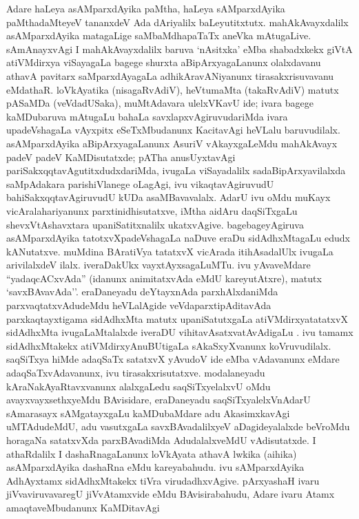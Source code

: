Adare haLeya asAMparxdAyika paMtha, haLeya sAMparxdAyika paMtha\-daMteyeV tananxdeV Ada dAriyalilx baLeyutitxtutx. mahAkAvayxdalilx asAMparxdAyika matagaLige saMbaMdhapaTaTx aneVka mAtugaLive. sAmAnayxvAgi I mahAkAvayxdalilx baruva `nAsitxka' eMba shabadxkekx  giVtA  atiVMdirxya viSayagaLa bagege shurxta aBipArxya\-gaLanunx olalx\-davanu athavA pavitarx saMparxdAyagaLa adhikAravANiyanunx tirasakxrisuvavanu eMdathaR. loVkAyatika (nisagaRvAdiV), heVtumaMta (takaRvAdiV) matutx pASaMDa (veVdadUSaka), muMtAdavara ulelxVKavU ide; ivara bagege kaMDu\-baruva mAtugaLu bahaLa savxlapxvAgiruvudariMda ivara upadeVshagaLa vAyxpitx eSeTxMbu\-danunx KacitavAgi heVLalu baruvudilalx. asAMparxdAyika aBipArxyagaLanunx AsuriV vAkayxgaLeMdu mahAkAvayx padeV padeV KaMDisutatxde; pATha anusUyxtavAgi pariSakxqqta\-vAgutitxdudxdariMda, ivugaLa viSayadalilx sadaBipArxyavilalxda saMpAdakara parishiVlanege oLagAgi, ivu vikaqtavAgiruvudU bahiSakxqqtavAgiruvudU kUDa asaMBavavalalx. AdarU ivu oMdu muKayx vicAralahariyanunx parxtinidhisutatxve, iMtha aidAru daqSiTxgaLu shevxVtAshavxtara upaniSatitxnalilx ukatxvAgive. bagebageyAgiruva asAMparxdAyika tatotxvXpadeVshagaLa naDuve eraDu sidAdhxMtagaLu edudx kANutatxve. muMdina BAratiVya tatatxvX vicArada itihAsadalUlx ivugaLa arivilalxdeV ilalx. iveraDakUkx vayxtAyxsagaLuMTu. ivu yAvaveMdare ``yadaqcACxvAda'' (idanunx animitatxvAda eMdU kareyutAtxre), matutx `savxBAvavAda''. eraDaneyadu deYtayxnAda parxhAlxdaniMda parxvaqtatxvAdudeMdu heVLalAgide  veVdaparxtipAditavAda parxkaqtayxtigama sidAdhxMta  matutx upaniSatutxgaLa atiVMdirxyatatatxvX sidAdhxMta  ivugaLaMtalalxde iveraDU vihitavAsatxvatAvAdigaLu . ivu tamamx sidAdhxMtakekx atiVMdirxyAnuBUtigaLa sAkaSxyXvanunx koVruvudilalx. saqSiTxya hiMde adaqSaTx satatxvX yAvudoV ide eMba vAdavanunx eMdare adaqSaTxvAdavanunx, ivu tirasakxrisutatxve. modalaneyadu kAraNakAyaRtavxvanunx alalxgaLedu saqSiTxyelalxvU oMdu avayxvayxsethxyeMdu BAvisidare, eraDaneyadu saqSiTxyalelxVnAdarU sAmarasayx sAMgatayxgaLu kaMDubaMdare adu AkasimxkavAgi uMTAdudeMdU, adu vasutxgaLa savxBAvadalilxyeV aDagideyalalxde beVroMdu horagaNa satatxvXda parxBAvadiMda AdudalalxveMdU vAdisutatxde. I athaRdalilx I dashaRnagaLanunx loVkAyata athavA lwkika (aihika) asAMparxdAyika dashaRna  eMdu kareyabahudu. ivu sAMparxdAyika AdhAyxtamx sidAdhxMtakekx tiVra virudadhxvAgive. pArxyashaH ivaru jiVvaviruvavaregU jiVvAtamxvide eMdu BAvisirabahudu, Adare ivaru Atamx amaqtaveMbudanunx KaMDitavAgi 